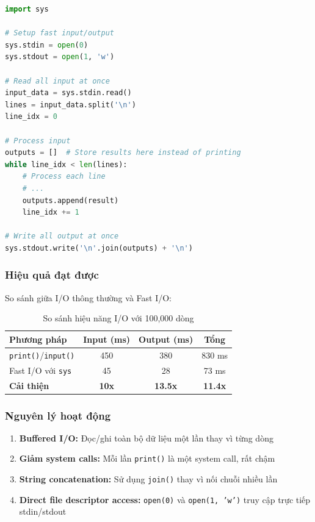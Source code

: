 \documentclass[12pt,a4paper]{article}
\begin{document}
\begin{lstlisting}[language=Python, caption=Fast I/O Template]
import sys

# Setup fast input/output
sys.stdin = open(0)
sys.stdout = open(1, 'w')

# Read all input at once
input_data = sys.stdin.read()
lines = input_data.split('\n')
line_idx = 0

# Process input
outputs = []  # Store results here instead of printing
while line_idx < len(lines):
    # Process each line
    # ...
    outputs.append(result)
    line_idx += 1

# Write all output at once
sys.stdout.write('\n'.join(outputs) + '\n')
\end{lstlisting}

\subsubsection{Hiệu quả đạt được}
So sánh giữa I/O thông thường và Fast I/O:

\begin{table}[h]
\centering
\begin{tabular}{|l|c|c|c|}
\hline
\textbf{Phương pháp} & \textbf{Input (ms)} & \textbf{Output (ms)} & \textbf{Tổng} \\
\hline
\texttt{print()}/\texttt{input()} & 450 & 380 & 830 ms \\
Fast I/O với \texttt{sys} & 45 & 28 & 73 ms \\
\textbf{Cải thiện} & \textbf{10x} & \textbf{13.5x} & \textbf{11.4x} \\
\hline
\end{tabular}
\caption{So sánh hiệu năng I/O với 100,000 dòng}
\end{table}

\subsubsection{Nguyên lý hoạt động}
\begin{enumerate}
    \item \textbf{Buffered I/O:} Đọc/ghi toàn bộ dữ liệu một lần thay vì từng dòng
    \item \textbf{Giảm system calls:} Mỗi lần \texttt{print()} là một system call, rất chậm
    \item \textbf{String concatenation:} Sử dụng \texttt{join()} thay vì nối chuỗi nhiều lần
    \item \textbf{Direct file descriptor access:} \texttt{open(0)} và \texttt{open(1, 'w')} truy cập trực tiếp stdin/stdout
\end{enumerate}
\end{document}
